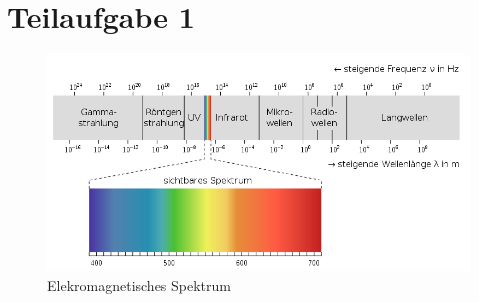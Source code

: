

\section{Teilaufgabe 1}

\begin{figure}[h]
    \begin{center}
        \includegraphics[width=12cm]{Bilder/emspekt.PNG}
    \end{center}
    \caption{Elekromagnetisches Spektrum}
   \end{figure}
